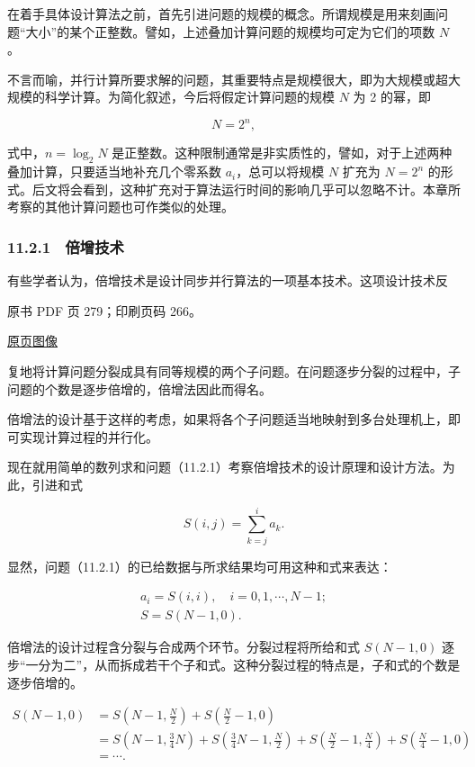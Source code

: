 在着手具体设计算法之前，首先引进问题的规模的概念。所谓规模是用来刻画问题``大小''的某个正整数。譬如，上述叠加计算问题的规模均可定为它们的项数 \(N\)。

不言而喻，并行计算所要求解的问题，其重要特点是规模很大，即为大规模或超大规模的科学计算。为简化叙述，今后将假定计算问题的规模 \(N\) 为 2 的幂，即

\[
N=2^n,
\]

式中，\(n=\log_2 N\) 是正整数。这种限制通常是非实质性的，譬如，对于上述两种叠加计算，只要适当地补充几个零系数 \(a_i\)，总可以将规模 \(N\) 扩充为 \(N=2^n\) 的形式。后文将会看到，这种扩充对于算法运行时间的影响几乎可以忽略不计。本章所考察的其他计算问题也可作类似的处理。

\subsubsection{11.2.1　倍增技术}\label{ch11-ux500dux589eux6280ux672f}

有些学者认为，倍增技术是设计同步并行算法的一项基本技术。这项设计技术反

\clearpage

原书 PDF 页 279；印刷页码 266。

\href{source-images/pdf-279.jpeg}{原页图像}

复地将计算问题分裂成具有同等规模的两个子问题。在问题逐步分裂的过程中，子问题的个数是逐步倍增的，倍增法因此而得名。

倍增法的设计基于这样的考虑，如果将各个子问题适当地映射到多台处理机上，即可实现计算过程的并行化。

现在就用简单的数列求和问题（11.2.1）考察倍增技术的设计原理和设计方法。为此，引进和式

\[
S(i,j)=\sum_{k=j}^{i}a_k.
\]

显然，问题（11.2.1）的已给数据与所求结果均可用这种和式来表达：

\[
\begin{gathered}
a_i=S(i,i),\quad i=0,1,\cdots,N-1;\\
S=S(N-1,0).
\end{gathered}
\]

倍增法的设计过程含分裂与合成两个环节。分裂过程将所给和式 \(S(N-1,0)\) 逐步``一分为二''，从而拆成若干个子和式。这种分裂过程的特点是，子和式的个数是逐步倍增的。

\[
\begin{aligned}
S(N-1,0)
&=S\left(N-1,\frac{N}{2}\right)+S\left(\frac{N}{2}-1,0\right)\\
&=S\left(N-1,\frac{3}{4}N\right)+S\left(\frac{3}{4}N-1,\frac{N}{2}\right)+S\left(\frac{N}{2}-1,\frac{N}{4}\right)+S\left(\frac{N}{4}-1,0\right)\\
&=\cdots.
\end{aligned}
\]

